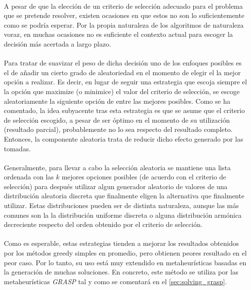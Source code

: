 \documentclass{subfiles}
\begin{document}
          \paragraph{}
          A pesar de que la elección de un criterio de selección adecuado para el problema que se pretende resolver, existen ocasiones en que estos no son lo suficientemente  como se podría esperar. Por la propia naturaleza de los algoritmos de naturaleza voraz, en muchas ocasiones no es suficiente el contexto actual para escoger la decisión más acertada a largo plazo. 

          \paragraph{}
          Para tratar de suavizar el peso de dicha decisión uno de los enfoques posibles es el de añadir un cierto grado de aleatoriedad en el momento de elegir el la mejor opción a realizar. Es decir, en lugar de seguir una estrategia que escoja siempre el la opción que maximize (o minimice) el valor del criterio de selección, se escoge aleatoriamente la siguiente opción de entre las mejores posibles. Como se ha comentado, la idea subyacente tras esta estrategia es que se asume que el criterio de selección escogido, a pesar de ser óptimo en el momento de su utilización (resultado parcial), probablemente no lo sea respecto del resultado completo. Entonces, la componente aleatoria trata de reducir dicho efecto generado por las  tomadas.

          \paragraph{}
          Generalmente, para llevar a cabo la selección aleatoria se mantiene una lista ordenada con las $k$ mejores opciones posibles (de acuerdo con el criterio de selección) para después utilizar algun generador aleatorio de valores de una distribución aleatoria discreta que finalmente eligen la alternativa que finalmente utilizar. Estas distribuciones pueden ser de distinta naturaleza, aunque las más comunes son la la distribución uniforme discreta o alguna distribución armónica decreciente respecto del orden obtenido por el criterio de selección.

          \paragraph{}
          Como es esperable, estas estrategias tienden a mejorar los resultados obtenidos por los métodos greedy simples en promedio, pero obtienen peores resultado en el peor caso. Por lo tanto, su uso está muy extendido en metaheurísticas basadas en la generación de muchas soluciones. En concreto, este método se utiliza por las metaheurísticas \emph{GRASP} tal y como se comentará en el \cref{sec:solving_grasp}. 
\end{document}
